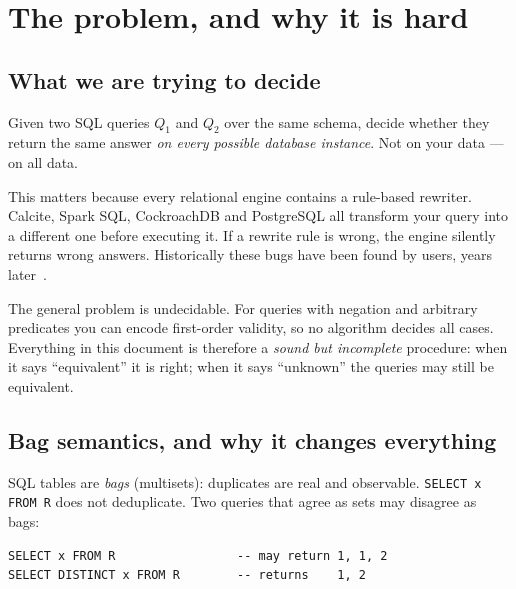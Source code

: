 \section{The problem, and why it is hard}
\label{sec:intro}

\subsection{What we are trying to decide}

Given two SQL queries $Q_1$ and $Q_2$ over the same schema, decide whether they return
the same answer \emph{on every possible database instance}. Not on your data --- on all data.

This matters because every relational engine contains a rule-based rewriter. Calcite,
Spark SQL, CockroachDB and PostgreSQL all transform your query into a different one before
executing it. If a rewrite rule is wrong, the engine silently returns wrong answers.
Historically these bugs have been found by users, years later~\cite{udp}.

The general problem is undecidable. For queries with negation and arbitrary predicates you
can encode first-order validity, so no algorithm decides all cases. Everything in this
document is therefore a \emph{sound but incomplete} procedure: when it says
``equivalent'' it is right; when it says ``unknown'' the queries may still be equivalent.


\subsection{Bag semantics, and why it changes everything}

SQL tables are \emph{bags} (multisets): duplicates are real and observable.
\lstinline|SELECT x FROM R| does not deduplicate. Two queries that agree as sets may
disagree as bags:

\begin{lstlisting}[style=sql]
SELECT x FROM R                 -- may return 1, 1, 2
SELECT DISTINCT x FROM R        -- returns    1, 2
\end{lstlisting}

